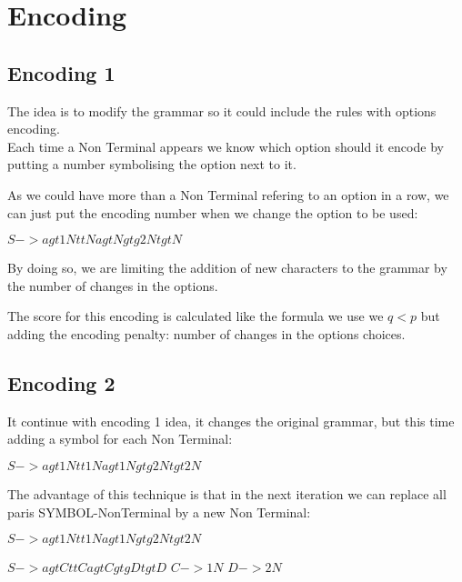 \chapter{Encoding}

\section{Encoding 1}

The idea is to modify the grammar so it could include the rules with options
encoding. \\

Each time a Non Terminal appears we know which option should it encode by 
putting a number symbolising the option next to it. 

As we could have more than a Non Terminal refering to an option in a row, we can
just put the encoding number when we change the option to be used:\\

\begin{center}
$S ->agt1NttNagtNgtg2NtgtN$
\end{center}
By doing so, we are limiting the addition of new characters to the grammar by 
the number of changes in the options.

The score for this encoding is calculated like the formula we use we $q<p$ but 
adding the encoding penalty: number of changes in the options choices.

\section{Encoding 2}

It continue with encoding 1 idea, it changes the original grammar, but this time
adding a symbol for each Non Terminal: \\
\begin{center}
$S ->agt1Ntt1Nagt1Ngtg2Ntgt2N$
\end{center}

The advantage of this technique is that in the next iteration we can replace all
paris SYMBOL-NonTerminal by a new Non Terminal: \\
\begin{center}
$S ->agt1Ntt1Nagt1Ngtg2Ntgt2N$
\end{center}

\begin{center}
$S ->agtCttCagtCgtgDtgtD$ 
$C -> 1N$ 
$D -> 2N$
\end{center}

